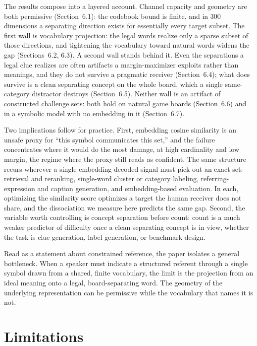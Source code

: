 \documentclass[11pt]{article}
\begin{document}
The results compose into a layered account. Channel capacity and geometry are
both permissive (Section~6.1): the codebook bound is finite, and in 300 dimensions
a separating direction exists for essentially every target subset. The first wall
is vocabulary projection: the legal words realize only a sparse subset of those
directions, and tightening the vocabulary toward natural words widens the gap
(Sections~6.2, 6.3). A second wall stands behind it. Even the separations a legal
clue realizes are often artifacts a margin-maximizer exploits rather than
meanings, and they do not survive a pragmatic receiver (Section~6.4); what does
survive is a clean separating concept on the whole board, which a single
same-category distractor destroys (Section~6.5). Neither wall is an artifact of
constructed challenge sets: both hold on natural game boards (Section~6.6) and in
a symbolic model with no embedding in it (Section~6.7).

Two implications follow for practice. First, embedding cosine similarity is an
unsafe proxy for ``this symbol communicates this set,'' and the failure
concentrates where it would do the most damage, at high cardinality and low
margin, the regime where the proxy still reads as confident. The same structure
recurs wherever a single embedding-decoded signal must pick out an exact set:
retrieval and reranking, single-word cluster or category labeling,
referring-expression and caption generation, and embedding-based evaluation. In
each, optimizing the similarity score optimizes a target the human receiver does
not share, and the dissociation we measure here predicts the same gap. Second, the
variable worth controlling is concept separation before count: count is a much
weaker predictor of difficulty once a clean separating concept is in view, whether
the task is clue generation, label generation, or benchmark design.

Read as a statement about constrained reference, the paper isolates a general
bottleneck. When a speaker must indicate a structured referent through a single
symbol drawn from a shared, finite vocabulary, the limit is the
projection from an ideal meaning onto a legal, board-separating word. The geometry
of the underlying representation can be permissive while the vocabulary that names
it is not.

\section{Limitations}\label{sec:limitations}
\end{document}
